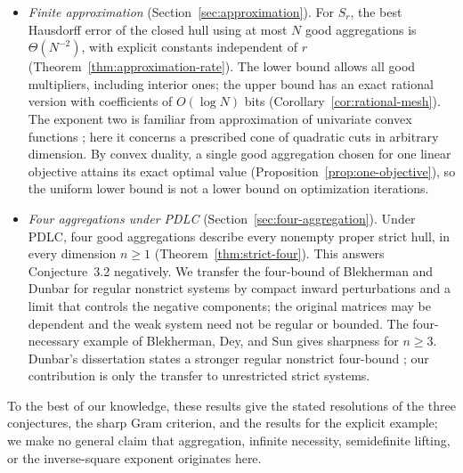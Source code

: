 \begin{itemize}
  affirmatively. More strongly, no countable conjunction of arbitrary
  strict quadratic inequalities describes the open hull, and no finite
  conjunction of arbitrary nonstrict quadratic inequalities describes
  its closure, in the original variables
  (Theorem~\ref{thm:no-finite-quadratics}). Both hulls have explicit
  finite semidefinite lifts, and a two-point decomposition proves the
  strict hull formula already in four variables
  (Theorem~\ref{thm:ball-hulls}). Section~\ref{sec:infinite-aggregation}
  compares this with earlier infinite examples, which lack HHC
  \citep{DMS2022}, and with semidefinite convexification of quadratic
  matrix programs \citep{Beck2007,Beck2009,WangKilincKarzan2024}.
\item \emph{Finite approximation} (Section~\ref{sec:approximation}).
  For $S_r$, the best Hausdorff error of the closed hull using at most
  $N$ good aggregations is $\Theta(N^{-2})$, with explicit constants
  independent of $r$ (Theorem~\ref{thm:approximation-rate}). The lower
  bound allows all good multipliers, including interior ones; the upper
  bound has an exact rational version with coefficients of $O(\log N)$
  bits (Corollary~\ref{cor:rational-mesh}). The exponent two is familiar
  from approximation of univariate convex functions \citep{Rote1992};
  here it concerns a prescribed cone of quadratic cuts in arbitrary
  dimension. By convex duality, a single good aggregation chosen for one
  linear objective attains its exact optimal value
  (Proposition~\ref{prop:one-objective}), so the uniform lower bound is
  not a lower bound on optimization iterations.
\item \emph{Four aggregations under PDLC}
  (Section~\ref{sec:four-aggregation}). Under PDLC, four good aggregations
  describe every nonempty proper strict hull, in every dimension $n\geq1$ (Theorem~\ref{thm:strict-four}). This answers
  Conjecture~3.2 negatively. We transfer the four-bound of Blekherman and
  Dunbar for regular nonstrict systems \citep{BD2025,BDpreprint} by
  compact inward perturbations and a limit that controls the negative
  components; the original matrices may be dependent and the weak
  system need not be regular or bounded. The four-necessary example
  of Blekherman, Dey, and Sun gives sharpness for $n\geq3$. Dunbar's
  dissertation states a stronger regular nonstrict four-bound
  \citep{Dunbar2025Thesis}; our contribution is only the transfer to
  unrestricted strict systems.
\end{itemize}

To the best of our knowledge, these results give the stated resolutions
of the three conjectures, the sharp Gram criterion, and the results for
the explicit example; we make no general claim that aggregation,
infinite necessity, semidefinite lifting, or the inverse-square exponent
originates here.

